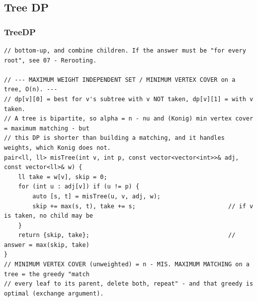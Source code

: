 \documentclass[9pt,a4paper,twocolumn]{extarticle}
\begin{document}
\subsection{Tree DP}

\filbreak
\subsubsection{TreeDP}
\nopagebreak
\begin{lstlisting}
// bottom-up, and combine children. If the answer must be "for every root", see 07 - Rerooting.

// --- MAXIMUM WEIGHT INDEPENDENT SET / MINIMUM VERTEX COVER on a tree, O(n). ---
// dp[v][0] = best for v's subtree with v NOT taken, dp[v][1] = with v taken.
// A tree is bipartite, so alpha = n - nu and (Konig) min vertex cover = maximum matching - but
// this DP is shorter than building a matching, and it handles weights, which Konig does not.
pair<ll, ll> misTree(int v, int p, const vector<vector<int>>& adj, const vector<ll>& w) {
    ll take = w[v], skip = 0;
    for (int u : adj[v]) if (u != p) {
        auto [s, t] = misTree(u, v, adj, w);
        skip += max(s, t), take += s;                          // if v is taken, no child may be
    }
    return {skip, take};                                       // answer = max(skip, take)
}
// MINIMUM VERTEX COVER (unweighted) = n - MIS. MAXIMUM MATCHING on a tree = the greedy "match
// every leaf to its parent, delete both, repeat" - and that greedy is optimal (exchange argument).


\end{lstlisting}
\end{document}
